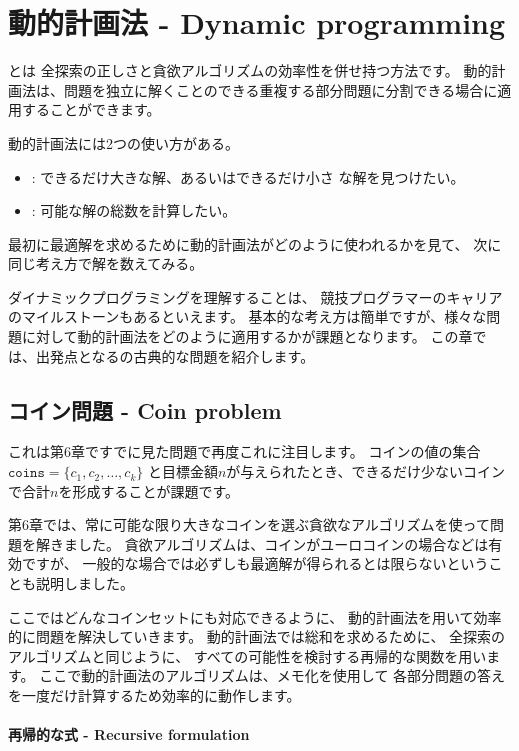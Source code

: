 \chapter{動的計画法 - Dynamic programming}


とは
全探索の正しさと貪欲アルゴリズムの効率性を併せ持つ方法です。
動的計画法は、問題を独立に解くことのできる重複する部分問題に分割できる場合に適用することができます。

動的計画法には2つの使い方がある。

\begin{itemize}
\item
{}:
できるだけ大きな解、あるいはできるだけ小さ
な解を見つけたい。
\item
{}:
可能な解の総数を計算したい。
\end{itemize}

最初に最適解を求めるために動的計画法がどのように使われるかを見て、 
次に同じ考え方で解を数えてみる。

ダイナミックプログラミングを理解することは、
競技プログラマーのキャリアのマイルストーンもあるといえます。
基本的な考え方は簡単ですが、様々な問題に対して動的計画法をどのように適用するかが課題となります。
この章では、出発点となるの古典的な問題を紹介します。

\section{コイン問題 - Coin problem}

これは第6章ですでに見た問題で再度これに注目します。
コインの値の集合$\texttt{coins} = \{c_1,c_2,\ldots,c_k\}$
と目標金額$n$が与えられたとき、できるだけ少ないコインで合計$n$を形成することが課題です。

第6章では、常に可能な限り大きなコインを選ぶ貪欲なアルゴリズムを使って問題を解きました。
貪欲アルゴリズムは、コインがユーロコインの場合などは有効ですが、
一般的な場合では必ずしも最適解が得られるとは限らないということも説明しました。

ここではどんなコインセットにも対応できるように、
動的計画法を用いて効率的に問題を解決していきます。
動的計画法では総和を求めるために、
全探索のアルゴリズムと同じように、
すべての可能性を検討する再帰的な関数を用います。
ここで動的計画法のアルゴリズムは、メモ化を使用して
各部分問題の答えを一度だけ計算するため効率的に動作します。

\subsubsection{再帰的な式 - Recursive formulation}

